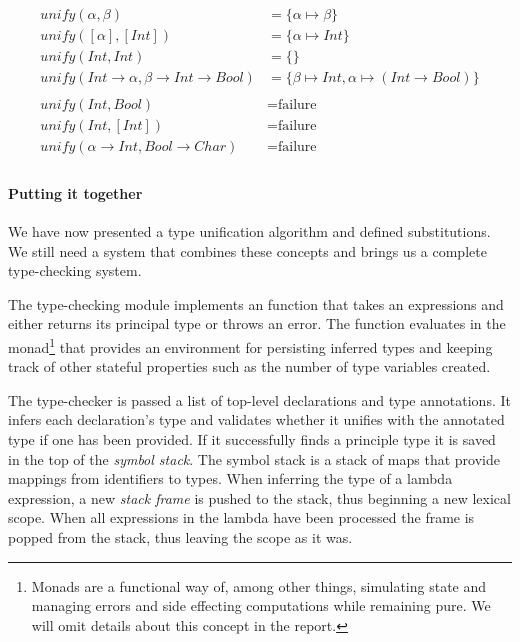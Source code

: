 \begin{align*}
unify(\alpha, \beta)                          & = \{ \alpha \mapsto \beta \}                             \\
unify([\alpha], [Int])                        & = \{ \alpha \mapsto Int \}                               \\
unify(Int, Int)                               & = \{  \}                                                 \\
unify(Int \to \alpha, \beta \to Int \to Bool) & = \{ \beta \mapsto Int, \alpha \mapsto (Int \to Bool) \} \\
                                                                                                         \\
unify(Int, Bool)                              & = \text{failure}                                         \\
unify(Int, [Int])                             & = \text{failure}                                         \\
unify(\alpha \to Int, Bool \to Char)          & = \text{failure}                                         \\
\end{align*}

\paragraph{Putting it together}
We have now presented a type unification algorithm and defined substitutions. We still need a system that combines these concepts and brings us a complete type-checking system.

The type-checking module  implements an  function that takes an expressions and either returns its principal type or throws an error. The  function evaluates in the  monad\footnote{Monads are a functional way of, among other things, simulating state and managing errors and side effecting computations while remaining pure. We will omit details about this concept in the report.} that provides an environment for persisting inferred types and keeping track of other stateful properties such as the number of type variables created.

The type-checker is passed a list of top-level declarations and type annotations. It infers each declaration's type and validates whether it unifies with the annotated type if one has been provided. If it successfully finds a principle type it is saved in the top of the \emph{symbol stack}. The symbol stack is a stack of maps that provide mappings from identifiers to types. When inferring the type of a lambda expression, a new \emph{stack frame} is pushed to the stack, thus beginning a new lexical scope. When all expressions in the lambda have been processed the frame is popped from the stack, thus leaving the scope as it was.

